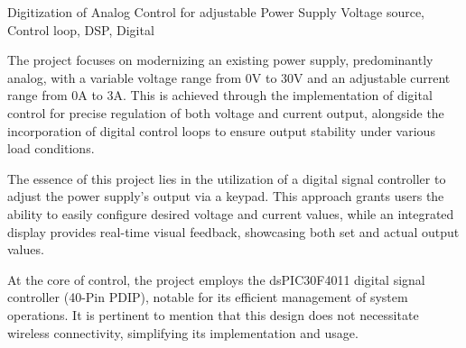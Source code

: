 
\begin{theabstract} {Digitization of Analog Control for adjustable Power Supply} {Voltage source, Control loop, DSP, Digital}

The project focuses on modernizing an existing power supply, predominantly analog, with a variable voltage range from 0V to 30V and an adjustable current range from 0A to 3A. This is achieved through the implementation of digital control for precise regulation of both voltage and current output, alongside the incorporation of digital control loops to ensure output stability under various load conditions.

The essence of this project lies in the utilization of a digital signal controller to adjust the power supply's output via a keypad. This approach grants users the ability to easily configure desired voltage and current values, while an integrated display provides real-time visual feedback, showcasing both set and actual output values.

At the core of control, the project employs the dsPIC30F4011 digital signal controller (40-Pin PDIP), notable for its efficient management of system operations. It is pertinent to mention that this design does not necessitate wireless connectivity, simplifying its implementation and usage.

\end{theabstract}

